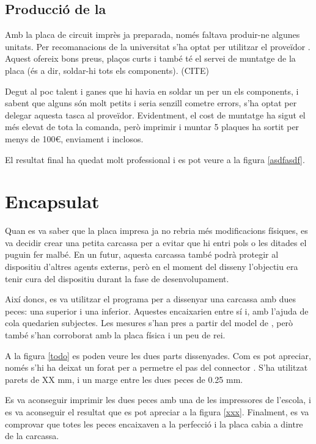 \subsection{Producció de la }

Amb la placa de circuit imprès ja preparada, només faltava produir-ne algunes
unitats. Per recomanacions de la universitat s'ha optat per utilitzar el
proveïdor . Aquest ofereix bons preus, plaços curts i també té el
servei de muntatge de la placa (és a dir, soldar-hi tots els components). (CITE)

Degut al poc talent i ganes que hi havia en soldar un per un els components, i
sabent que alguns són molt petits i seria senzill cometre errors, s'ha optat
per delegar aquesta tasca al proveïdor. Evidentment, el cost de muntatge ha
sigut el més elevat de tota la comanda, però imprimir i muntar 5 plaques
ha sortit per menys de 100€, enviament i  inclosos.

El resultat final ha quedat molt professional i es pot veure a la figura
\ref{asdfasdf}.

\section{Encapsulat}

Quan es va saber que la placa impresa ja no rebria més modificacions físiques,
es va decidir crear una petita carcassa per a evitar que hi entri pols o les
ditades el puguin fer malbé. En un futur, aquesta carcassa també podrà protegir
al dispositiu d'altres agents externs, però en el moment del disseny l'objectiu
era tenir cura del dispositiu durant la fase de desenvolupament.

Així doncs, es va utilitzar el programa  per a dissenyar una
carcassa amb dues peces: una superior i una inferior. Aquestes encaixarien entre
sí i, amb l'ajuda de cola quedarien subjectes. Les mesures s'han pres a partir
del model de , però també s'han corroborat amb la placa física i un
peu de rei.

A la figura \ref{todo} es poden veure les dues parts dissenyades. Com es pot
apreciar, només s'hi ha deixat un forat per a permetre el pas del connector
. S'ha utilitzat parets de XX mm, i un marge entre les dues peces de
0.25 mm.

Es va aconseguir imprimir les dues peces amb una de les impressores de
l'escola, i es va aconseguir el resultat que es pot apreciar a la figura
\ref{xxx}. Finalment, es va comprovar que totes les peces encaixaven a la
perfecció i la placa cabia a dintre de la carcassa.

